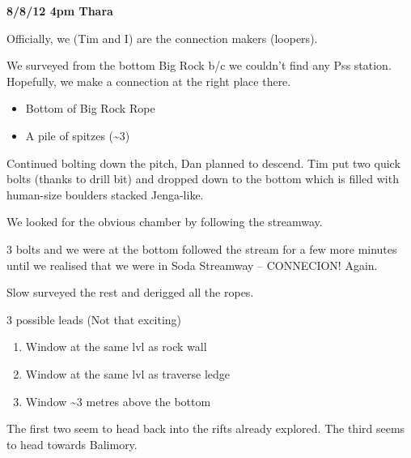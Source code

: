 \textbf{8/8/12 4pm Thara}

Officially, we (Tim and I) are the connection makers (loopers).

We surveyed from the bottom Big Rock b/c we couldn't find any Pss
station. Hopefully, we make a connection at the right place there.

\begin{itemize}
\tightlist
\item
  Bottom of Big Rock Rope
\item
  A pile of spitzes (\textasciitilde{}3)
\end{itemize}

Continued bolting down the pitch, Dan planned to descend. Tim put two
quick bolts (thanks to drill bit) and dropped down to the bottom which
is filled with human-size boulders stacked Jenga-like.

We looked for the obvious chamber by following the streamway.

3 bolts and we were at the bottom followed the stream for a few more
minutes until we realised that we were in Soda Streamway -- CONNECION!
Again.

Slow surveyed the rest and derigged all the ropes.

3 possible leads (Not that exciting)

\begin{enumerate}
\def\labelenumi{\arabic{enumi}.}
\tightlist
\item
  Window at the same lvl as rock wall
\item
  Window at the same lvl as traverse ledge
\item
  Window \textasciitilde{}3 metres above the bottom
\end{enumerate}

The first two seem to head back into the rifts already explored. The
third seems to head towards Balimory.

